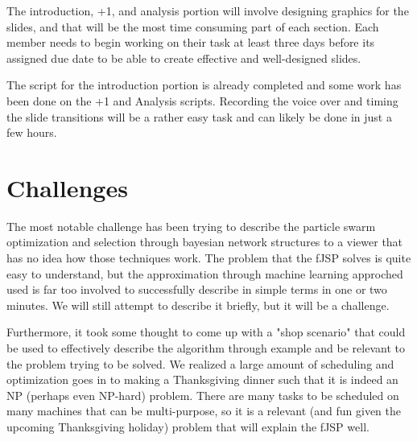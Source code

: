 \documentclass[11pt,twocolumn]{article}
\begin{document}
	The introduction, +1, and analysis portion will involve designing graphics for the slides, and that will be the most time consuming part of each section.  Each member needs to begin working on their task at least three days before its assigned due date to be able to create effective and well-designed slides.
	
	The script for the introduction portion is already completed and some work has been done on the +1 and Analysis scripts.  Recording the voice over and timing the slide transitions will be a rather easy task and can likely be done in just a few hours.
	
	\section{Challenges}

	The most notable challenge has been trying to describe the particle swarm optimization and selection through bayesian network structures to a viewer that has no idea how those techniques work.  The problem that the fJSP solves is quite easy to understand, but the approximation through machine learning approched used is far too involved to successfully describe in simple terms in one or two minutes.  We will still attempt to describe it briefly, but it will be a challenge.
	
	Furthermore, it took some thought to come up with a "shop scenario" that could be used to effectively describe the algorithm through example and be relevant to the problem trying to be solved.  We realized a large amount of scheduling and optimization goes in to making a Thanksgiving dinner such that it is indeed an NP (perhaps even NP-hard) problem.  There are many tasks to be scheduled on many machines that can be multi-purpose, so it is a relevant (and fun given the upcoming Thanksgiving holiday) problem that will explain the fJSP well. 
	
\end{document}
